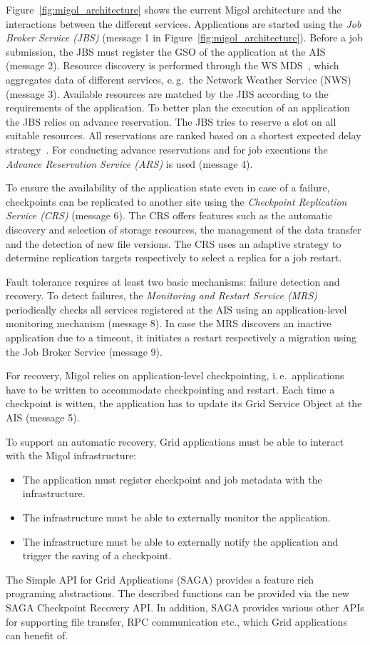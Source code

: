 \documentclass[times, 10pt,twocolumn]{article}
\begin{document}
Figure~\ref{fig:migol_architecture} shows the current Migol architecture and
the interactions between the different services.  Applications are
started using the {\em Job Broker Service (JBS)} (message 1 in 
Figure~\ref{fig:migol_architecture}). Before a job
submission, the JBS must register the GSO of the application at the AIS (message 2).
Resource discovery is performed through the WS MDS~\cite{schopf06},
which aggregates data of different services, e.\,g.\ the Network
Weather Service (NWS)~\cite{NWS99} (message 3).  Available resources are matched
by the JBS according to the requirements of the application. To better plan the execution of 
an application the JBS relies on advance reservation. The JBS tries to reserve a slot on all suitable
resources. All reservations are ranked based on a shortest expected
delay strategy~\cite{Jeske:2007wj}.  For conducting advance reservations and for job executions the
\emph{Advance Reservation Service (ARS)} is used (message 4).
             
To ensure the availability of the application state even in case of a failure, 
checkpoints can be replicated to another site  using the \emph{Checkpoint Replication Service
(CRS)} (message 6).  The CRS offers features such as the automatic discovery and selection of storage resources, 
the management of the data transfer and the detection of new file versions. 
The CRS uses an adaptive strategy to determine replication  targets respectively to select a replica for a
job restart.


Fault tolerance requires at least two basic mechanisms: failure
detection and recovery. To detect failures, the \emph{Monitoring and Restart Service (MRS)}
periodically checks all services registered at the AIS using an
application-level monitoring mechanism (message 8). In case the MRS discovers an inactive
application due to a timeout, it initiates a restart respectively a migration using the
Job Broker Service (message 9).  

For recovery, Migol relies on 
application-level checkpointing, i.\,e.\ applications have to be
written to accommodate checkpointing and restart. 
Each time a checkpoint is witten, the application has to update
its Grid Service Object at the AIS (message 5). 

To support an automatic recovery, Grid applications must be able to interact with the Migol infrastructure:
\begin{itemize}
    \item The application must register checkpoint and job metadata with the infrastructure.
    \item The infrastructure must be able to externally monitor the application.
    \item The infrastructure must be able to externally notify the application and trigger the saving of a checkpoint.
\end{itemize}  
The Simple API for Grid Applications (SAGA) provides a feature rich programing abstractions. The described functions 
can be  provided via the new SAGA Checkpoint Recovery API. In addition, SAGA provides  
various other APIs for supporting file transfer, RPC communication etc., which Grid applications can benefit of.
\end{document}
